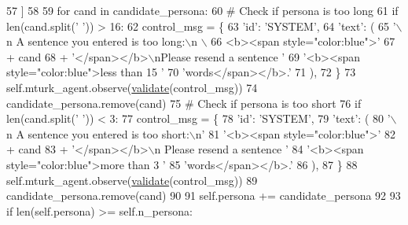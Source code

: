 \begin{DoxyCode}
57             ]
58 
59             \textcolor{keywordflow}{for} cand \textcolor{keywordflow}{in} candidate\_persona:
60                 \textcolor{comment}{# Check if persona is too long}
61                 \textcolor{keywordflow}{if} len(cand.split(\textcolor{stringliteral}{' '})) > 16:
62                     control\_msg = \{
63                         \textcolor{stringliteral}{'id'}: \textcolor{stringliteral}{'SYSTEM'},
64                         \textcolor{stringliteral}{'text'}: (
65                             \textcolor{stringliteral}{'\(\backslash\)n A sentence you entered is too long:\(\backslash\)n \(\backslash\)}
66 \textcolor{stringliteral}{                            <b><span style="color:blue">'}
67                             + cand
68                             + \textcolor{stringliteral}{'</span></b>\(\backslash\)nPlease resend a sentence '}
69                             \textcolor{stringliteral}{'<b><span style="color:blue">less than 15 '}
70                             \textcolor{stringliteral}{'words</span></b>.'}
71                         ),
72                     \}
73                     self.mturk\_agent.observe(\hyperlink{namespaceparlai_1_1core_1_1worlds_afc3fad603b7bce41dbdc9cdc04a9c794}{validate}(control\_msg))
74                     candidate\_persona.remove(cand)
75                 \textcolor{comment}{# Check if persona is too short}
76                 \textcolor{keywordflow}{if} len(cand.split(\textcolor{stringliteral}{' '})) < 3:
77                     control\_msg = \{
78                         \textcolor{stringliteral}{'id'}: \textcolor{stringliteral}{'SYSTEM'},
79                         \textcolor{stringliteral}{'text'}: (
80                             \textcolor{stringliteral}{'\(\backslash\)n A sentence you entered is too short:\(\backslash\)n'}
81                             \textcolor{stringliteral}{'<b><span style="color:blue">'}
82                             + cand
83                             + \textcolor{stringliteral}{'</span></b>\(\backslash\)n Please resend a sentence '}
84                             \textcolor{stringliteral}{'<b><span style="color:blue">more than 3 '}
85                             \textcolor{stringliteral}{'words</span></b>.'}
86                         ),
87                     \}
88                     self.mturk\_agent.observe(\hyperlink{namespaceparlai_1_1core_1_1worlds_afc3fad603b7bce41dbdc9cdc04a9c794}{validate}(control\_msg))
89                     candidate\_persona.remove(cand)
90 
91             self.persona += candidate\_persona
92 
93             \textcolor{keywordflow}{if} len(self.persona) >= self.n\_persona:

\end{DoxyCode}

